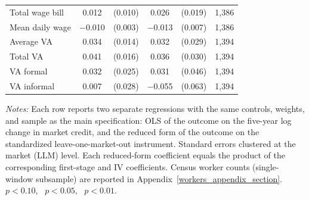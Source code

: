 \begin{threeparttable}
\begin{tabular}{lccccr}
        Total wage bill  & 0.012 & (0.010) & 0.026 & (0.019) & 1{,}386 \\
        Mean daily wage  & $-$0.010\sym{***} & (0.003) & $-$0.013\sym{*} & (0.007) & 1{,}386 \\
        Average VA       & 0.034\sym{**} & (0.014) & 0.032 & (0.029) & 1{,}394 \\
        Total VA         & 0.041\sym{***} & (0.016) & 0.036 & (0.030) & 1{,}394 \\
        VA formal        & 0.032 & (0.025) & 0.031 & (0.046) & 1{,}394 \\
        VA informal      & 0.007 & (0.028) & $-$0.055 & (0.063) & 1{,}394 \\
        \bottomrule
    \end{tabular}
    \begin{tablenotes}[flushleft]
        \footnotesize
        \item \textit{Notes:} Each row reports two separate regressions with the same controls, weights, and sample as the main specification: OLS of the outcome on the five-year log change in market credit, and the reduced form of the outcome on the standardized leave-one-market-out instrument. Standard errors clustered at the market (LLM) level. Each reduced-form coefficient equals the product of the corresponding first-stage and IV coefficients. Census worker counts (single-window subsample) are reported in Appendix~\ref{workers_appendix_section}. \sym{*}~$p<0.10$, \sym{**}~$p<0.05$, \sym{***}~$p<0.01$.
    \end{tablenotes}
\end{threeparttable}